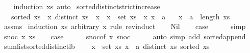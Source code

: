 \begin{isabellebody}
%
\isadelimproof
\ \ %
\endisadelimproof
%
\isatagproof
{}\isamarkupfalse%
\ {\isacharparenleft}induction\ xs{\isacharcomma}\ auto{\isacharparenright}%
\endisatagproof
{\isafoldproof}%
%
\isadelimproof
\isanewline
%
\endisadelimproof
\isanewline
{}\isamarkupfalse%
\ sorted{\isacharunderscore}distinct{\isacharunderscore}strict{\isacharunderscore}increase{\isacharcolon}\isanewline
\ \ \ {\isachardoublequoteopen}sorted\ {\isacharparenleft}xs\ {\isacharat}\ {\isacharbrackleft}x{\isacharbrackright}{\isacharparenright}{\isachardoublequoteclose}\ {\isachardoublequoteopen}distinct\ {\isacharparenleft}xs\ {\isacharat}\ {\isacharbrackleft}x{\isacharbrackright}{\isacharparenright}{\isachardoublequoteclose}\ {\isachardoublequoteopen}{\isasymforall}\ x\ {\isasymin}\ set\ {\isacharparenleft}xs\ {\isacharat}\ {\isacharbrackleft}x{\isacharbrackright}{\isacharparenright}{\isachardot}\ x\ {\isachargreater}\ a{\isachardoublequoteclose}\isanewline
\ \ \ {\isachardoublequoteopen}x\ {\isachargreater}\ a\ {\isacharplus}\ length\ xs{\isachardoublequoteclose}\isanewline
%
\isadelimproof
\ \ %
\endisadelimproof
%
\isatagproof
{}\isamarkupfalse%
\ assms\isanewline
{}\isamarkupfalse%
\ {\isacharparenleft}induction\ xs\ arbitrary{\isacharcolon}\ x\ rule{\isacharcolon}\ rev{\isacharunderscore}induct{\isacharparenright}\isanewline
\ \ \isamarkupfalse%
\ Nil\isanewline
\ \ \isamarkupfalse%
\ {\isacharquery}case\isanewline
\ \ \ \ \isamarkupfalse%
\ simp\isanewline
{}\isamarkupfalse%
\isanewline
\ \ \isamarkupfalse%
\ {\isacharparenleft}snoc\ x{\isacharprime}\ xs{\isacharparenright}\isanewline
\ \ \isamarkupfalse%
\ {\isacharquery}case\isanewline
\ \ \ \ \isamarkupfalse%
\ snoc{\isacharparenleft}{}{\isacharparenright}{\isacharbrackleft}of\ x{\isacharprime}{\isacharbrackright}\ snoc{\isacharparenleft}{}{\isacharminus}{\isacharparenright}\isanewline
\ \ \ \ \isamarkupfalse%
\ {\isacharparenleft}auto\ simp\ add{\isacharcolon}\ sorted{\isacharunderscore}append{\isacharparenright}\isanewline
{}\isamarkupfalse%
%
\endisatagproof
{\isafoldproof}%
%
\isadelimproof
\isanewline
%
\endisadelimproof
\isanewline
{}\isamarkupfalse%
\ sum{\isacharunderscore}list{\isacharunderscore}sorted{\isacharunderscore}distinct{\isacharunderscore}lb{\isacharcolon}\isanewline
\ \ \ {\isachardoublequoteopen}{\isasymforall}\ x\ {\isasymin}\ set\ xs{\isachardot}\ x\ {\isachargreater}\ a{\isachardoublequoteclose}\ {\isachardoublequoteopen}distinct\ xs{\isachardoublequoteclose}\ {\isachardoublequoteopen}sorted\ xs{\isachardoublequoteclose}\isanewline

\end{isabellebody}
